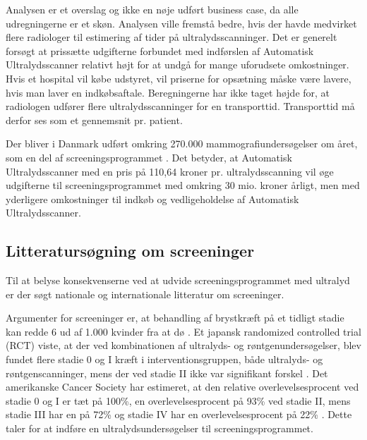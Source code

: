 Analysen er et overslag og ikke en nøje udført business case, da alle udregningerne er et skøn. Analysen ville fremstå bedre, hvis der havde medvirket flere radiologer til estimering af tider på ultralydsscanninger. Det er generelt forsøgt at prissætte udgifterne forbundet med indførslen af Automatisk Ultralydsscanner relativt højt for at undgå for mange uforudsete omkostninger. Hvis et hospital vil købe udstyret, vil priserne for opsætning måske være lavere, hvis man laver en indkøbsaftale. Beregningerne har ikke taget højde for, at radiologen udfører flere ultralydsscanninger for en transporttid. Transporttid må derfor ses som et gennemsnit pr. patient.

Der bliver i Danmark udført omkring 270.000 mammografiundersøgelser om året, som en del af screeningsprogrammet \cite{esundhed}. Det betyder, at Automatisk Ultralydsscanner med en pris på 110,64 kroner pr. ultralydsscanning vil øge udgifterne til screeningsprogrammet med omkring 30 mio. kroner årligt, men med yderligere omkostninger til indkøb og vedligeholdelse af Automatisk Ultralydsscanner. 

\subsection{Litteratursøgning om screeninger}
Til at belyse konsekvenserne ved at udvide screeningsprogrammet med ultralyd er der søgt nationale og internationale litteratur om screeninger. 

Argumenter for screeninger er, at behandling af brystkræft på et tidligt stadie kan redde 6 ud af 1.000 kvinder fra at dø \cite{Argumenter}. Et japansk randomized controlled trial (RCT) viste, at der ved kombinationen af ultralyds- og røntgenundersøgelser, blev fundet flere stadie 0 og I kræft i interventionsgruppen, både ultralyds- og røntgenscanninger, mens der ved stadie II ikke var signifikant forskel \cite{Japan}. Det amerikanske Cancer Society har estimeret, at den relative overlevelsesprocent ved stadie 0 og I er tæt på 100\%, en overlevelsesprocent på 93\% ved stadie II, mens stadie III har en på 72\% og stadie IV har en overlevelsesprocent på 22\% \cite{CancerSociety}. Dette taler for at indføre en ultralydsundersøgelser til screeningsprogrammet. 

